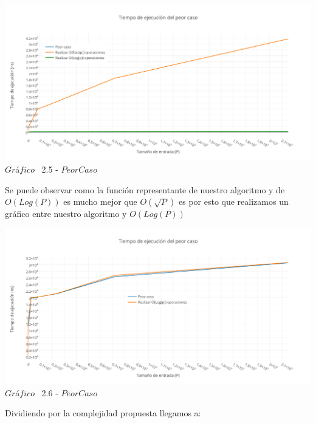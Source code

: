 \vspace*{0.3cm} \vspace*{0.3cm}
  \begin{center}
 \includegraphics[scale=0.65]{./EJ2/peorcaso.png}
 {$Gr$\'a$fico$ \ 2.5 - $Peor Caso$}
  \end{center}
  \vspace*{0.3cm}

Se puede observar como la funci\'on representante de nuestro algoritmo y de $O(Log(P))$ es mucho mejor que $O(\sqrt{P})$ es por esto que realizamos un gr\'afico entre nuestro algoritmo y $O(Log(P))$

\vspace*{0.3cm} \vspace*{0.3cm}
  \begin{center}
 \includegraphics[scale=0.65]{./EJ2/peorcaso1.png}
 {$Gr$\'a$fico$ \ 2.6 - $Peor Caso$}
  \end{center}
  \vspace*{0.3cm}

Dividiendo por la complejidad propuesta llegamos a:\\

